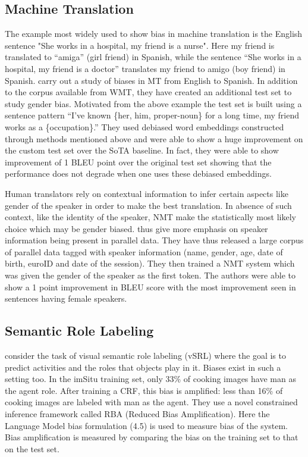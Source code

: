 \documentclass[11pt,a4paper]{article}
\begin{document}
\begin{enumerate}
    \subsection{Machine Translation}
    The example most widely used to show bias in machine translation is the English sentence "She works in a hospital, my friend is a nurse". Here my friend is translated to ``amiga'' (girl friend) in Spanish, while the sentence ``She works in a hospital, my friend is a doctor'' translates my friend to amigo (boy friend) in Spanish. \citet{escude-font-costa-jussa-2019-equalizing} carry out a study of biases in MT from English to Spanish. In addition to the corpus available from WMT, they have created an additional test set to study gender bias. Motivated from the above example the test set is built using a sentence pattern ``I've known \{her, him, proper-noun\} for a long time, my friend works as a \{occupation\}.'' They used debiased word embeddings constructed through methods mentioned above and were able to show a huge improvement on the custom test set over the SoTA baseline. In fact, they were able to show improvement of 1 BLEU point over the original test set showing that the performance does not degrade when one uses these debiased embeddings.
    
    Human translators rely on contextual information to infer certain aspects like gender of the speaker in order to make the best translation. In absence of such context, like the identity of the speaker, NMT make the statistically most likely choice which may be gender biased. \citet{vanmassenhove-etal-2018-getting} thus give more emphasis on speaker information being present in parallel data. They have thus released a large corpus of parallel data tagged with speaker information (name, gender, age, date of birth, euroID and date of the session). They then trained a NMT system which was given the gender of the speaker as the first token. The authors were able to show a 1 point improvement in BLEU score with the most improvement seen in sentences having female speakers.
    
    \subsection{Semantic Role Labeling}
    \citet{menshopping} consider the task of visual semantic role labeling (vSRL) where the goal is to predict activities and the roles that objects play in it. Biases exist in such a setting too. In the imSitu training set, only 33\% of cooking images have man as the agent role. After training a CRF, this bias is amplified: less than 16\% of cooking images are labeled with man as the agent. They use a novel constrained inference framework called RBA (Reduced Bias Amplification). Here the Language Model bias formulation (4.5) is used to measure bias of the system. Bias amplification is measured by comparing the bias on the training set to that on the test set.
    

\end{enumerate}
\end{document}
